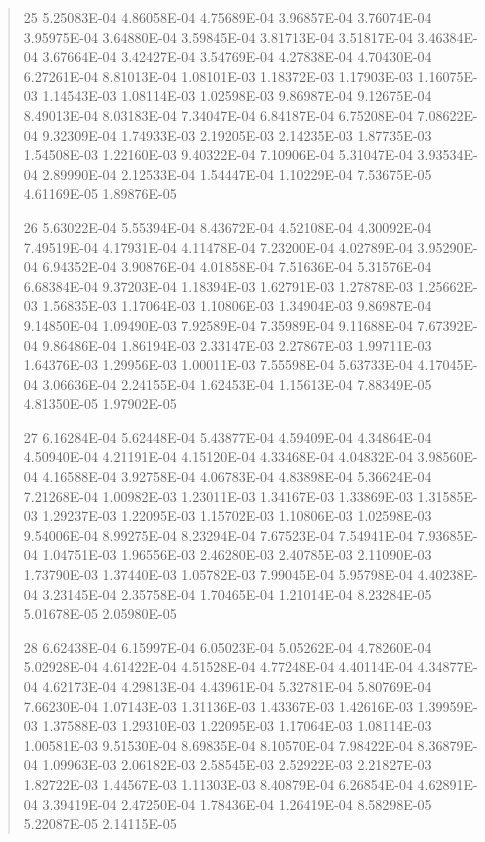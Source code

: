 \documentclass[letterpaper,10pt,english]{sphinxmanual}
\begin{document}
\begin{quote}
\begin{DUlineblock}{0em}
\item[] 25   5.25083E-04  4.86058E-04  4.75689E-04  3.96857E-04  3.76074E-04  3.95975E-04  3.64880E-04  3.59845E-04  3.81713E-04  3.51817E-04  3.46384E-04  3.67664E-04  3.42427E-04  3.54769E-04  4.27838E-04  4.70430E-04  6.27261E-04  8.81013E-04  1.08101E-03  1.18372E-03  1.17903E-03  1.16075E-03  1.14543E-03  1.08114E-03  1.02598E-03  9.86987E-04  9.12675E-04  8.49013E-04  8.03183E-04  7.34047E-04  6.84187E-04  6.75208E-04  7.08622E-04  9.32309E-04  1.74933E-03  2.19205E-03  2.14235E-03  1.87735E-03  1.54508E-03  1.22160E-03  9.40322E-04  7.10906E-04  5.31047E-04  3.93534E-04  2.89990E-04  2.12533E-04  1.54447E-04  1.10229E-04  7.53675E-05  4.61169E-05  1.89876E-05
\item[] 26   5.63022E-04  5.55394E-04  8.43672E-04  4.52108E-04  4.30092E-04  7.49519E-04  4.17931E-04  4.11478E-04  7.23200E-04  4.02789E-04  3.95290E-04  6.94352E-04  3.90876E-04  4.01858E-04  7.51636E-04  5.31576E-04  6.68384E-04  9.37203E-04  1.18394E-03  1.62791E-03  1.27878E-03  1.25662E-03  1.56835E-03  1.17064E-03  1.10806E-03  1.34904E-03  9.86987E-04  9.14850E-04  1.09490E-03  7.92589E-04  7.35989E-04  9.11688E-04  7.67392E-04  9.86486E-04  1.86194E-03  2.33147E-03  2.27867E-03  1.99711E-03  1.64376E-03  1.29956E-03  1.00011E-03  7.55598E-04  5.63733E-04  4.17045E-04  3.06636E-04  2.24155E-04  1.62453E-04  1.15613E-04  7.88349E-05  4.81350E-05  1.97902E-05
\item[] 27   6.16284E-04  5.62448E-04  5.43877E-04  4.59409E-04  4.34864E-04  4.50940E-04  4.21191E-04  4.15120E-04  4.33468E-04  4.04832E-04  3.98560E-04  4.16588E-04  3.92758E-04  4.06783E-04  4.83898E-04  5.36624E-04  7.21268E-04  1.00982E-03  1.23011E-03  1.34167E-03  1.33869E-03  1.31585E-03  1.29237E-03  1.22095E-03  1.15702E-03  1.10806E-03  1.02598E-03  9.54006E-04  8.99275E-04  8.23294E-04  7.67523E-04  7.54941E-04  7.93685E-04  1.04751E-03  1.96556E-03  2.46280E-03  2.40785E-03  2.11090E-03  1.73790E-03  1.37440E-03  1.05782E-03  7.99045E-04  5.95798E-04  4.40238E-04  3.23145E-04  2.35758E-04  1.70465E-04  1.21014E-04  8.23284E-05  5.01678E-05  2.05980E-05
\item[] 28   6.62438E-04  6.15997E-04  6.05023E-04  5.05262E-04  4.78260E-04  5.02928E-04  4.61422E-04  4.51528E-04  4.77248E-04  4.40114E-04  4.34877E-04  4.62173E-04  4.29813E-04  4.43961E-04  5.32781E-04  5.80769E-04  7.66230E-04  1.07143E-03  1.31136E-03  1.43367E-03  1.42616E-03  1.39959E-03  1.37588E-03  1.29310E-03  1.22095E-03  1.17064E-03  1.08114E-03  1.00581E-03  9.51530E-04  8.69835E-04  8.10570E-04  7.98422E-04  8.36879E-04  1.09963E-03  2.06182E-03  2.58545E-03  2.52922E-03  2.21827E-03  1.82722E-03  1.44567E-03  1.11303E-03  8.40879E-04  6.26854E-04  4.62891E-04  3.39419E-04  2.47250E-04  1.78436E-04  1.26419E-04  8.58298E-05  5.22087E-05  2.14115E-05

\end{DUlineblock}
\end{quote}
\end{document}
